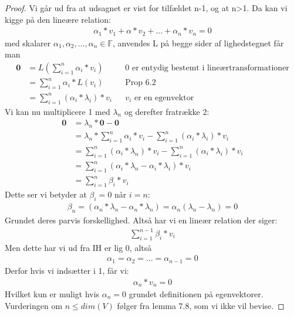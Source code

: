 \documentclass[paper=a4, fontsize=11pt]{scrartcl} %
\begin{document}
	
	\begin{proof}
		Vi går ud fra at udsagnet er vist for tilfældet n-1, og at n>1. Da kan vi kigge på den lineære relation:
		\setcounter{equation}{0}
		\begin{gather}
			\alpha_1*v_1+\alpha*v_2+...+\alpha_n*v_n=0
		\end{gather} 
		med skalarer $\alpha_1,\alpha_2,...,\alpha_n\in\mathbb{F}$, anvendes L på begge sider af lighedstegnet får man
		\begin{align}
			\mathbf{0}&=L(\sum_{i=1}^{n}\alpha_i*v_i) &&\text{0 er entydig bestemt i lineærtransformationer} \\
			&=\sum_{i=1}^{n}\alpha_i*L(v_i) &&\text{Prop 6.2} \\
			&=\sum_{i=1}^{n}(\alpha_i*\lambda_i)*v_i&&\text{$v_i$ er en egenvektor}
		\end{align}
		Vi kan nu multiplicere 1 med $\lambda_n$ og derefter fratrække 2:
		\begin{align*}
			\mathbf{0}&=\lambda_n*\mathbf{0}-\mathbf{0} \\
			&=\lambda_n*\sum_{i=1}^{n}\alpha_i*v_i-\sum_{i=1}^{n}(\alpha_i*\lambda_i)*v_i \\
			&=\sum_{i=1}^{n}(\alpha_i*\lambda_n)*v_i-\sum_{i=1}^{n}(\alpha_i*\lambda_i)*v_i \\
			&=\sum_{i=1}^{n}(\alpha_i*\lambda_n-\alpha_i*\lambda_i)*v_i \\
			&=\sum_{i=1}^{n}\beta_i*v_i
		\end{align*}
		Dette ser vi betyder at $\beta_i=0$ når $i=n$:
		\begin{align*}
			\beta_n=(\alpha_n*\lambda_n-\alpha_n*\lambda_n)=\alpha_n(\lambda_n-\lambda_n)=0
		\end{align*}
		Grundet deres parvis forskellighed. Altså har vi en lineær relation der siger:
		\begin{align*}
			\sum_{i=1}^{n-1}\beta_i*v_i
		\end{align*}
		Men dette har vi ud fra IH er lig 0, altså
		\begin{align*}
			\alpha_1=\alpha_2=...=\alpha_{n-1}=0
		\end{align*}
		Derfor hvis vi indsætter i 1, får vi:
		\begin{align*}
			\alpha_n*v_n=0
		\end{align*}
		Hvilket kun er muligt hvis $\alpha_n=0$ grundet definitionen på egenvektorer. Vurderingen om $n\leq dim(V)$ følger fra lemma 7.8, som vi ikke vil bevise.
		
	\end{proof}
	
\end{document}
